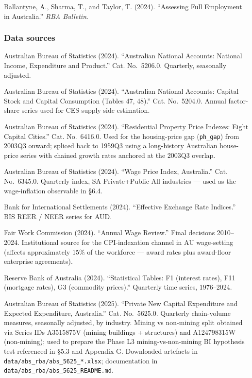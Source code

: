 \documentclass[
]{article}
\begin{document}
Ballantyne, A., Sharma, T., and Taylor, T. (2024). ``Assessing Full
Employment in Australia.'' \emph{RBA Bulletin}.

\subsubsection{Data sources}\label{data-sources}

Australian Bureau of Statistics (2024). ``Australian National Accounts:
National Income, Expenditure and Product.'' Cat. No.~5206.0. Quarterly,
seasonally adjusted.

Australian Bureau of Statistics (2024). ``Australian National Accounts:
Capital Stock and Capital Consumption (Tables 47, 48).'' Cat.
No.~5204.0. Annual factor-share series used for CES supply-side
estimation.

Australian Bureau of Statistics (2024). ``Residential Property Price
Indexes: Eight Capital Cities.'' Cat. No.~6416.0. Used for the
housing-price gap (\texttt{ph\_gap}) from 2003Q3 onward; spliced back to
1959Q3 using a long-history Australian house-price series with chained
growth rates anchored at the 2003Q3 overlap.

Australian Bureau of Statistics (2024). ``Wage Price Index, Australia.''
Cat. No.~6345.0. Quarterly index, SA Private+Public All industries ---
used as the wage-inflation observable in §6.4.

Bank for International Settlements (2024). ``Effective Exchange Rate
Indices.'' BIS REER / NEER series for AUD.

Fair Work Commission (2024). ``Annual Wage Review.'' Final decisions
2010--2024. Institutional source for the CPI-indexation channel in AU
wage-setting (affects approximately 15\% of the workforce --- award
rates plus award-floor enterprise agreements).

Reserve Bank of Australia (2024). ``Statistical Tables: F1 (interest
rates), F11 (mortgage rates), G3 (commodity prices).'' Quarterly time
series, 1976--2024.

Australian Bureau of Statistics (2025). ``Private New Capital
Expenditure and Expected Expenditure, Australia.'' Cat. No.~5625.0.
Quarterly chain-volume measures, seasonally adjusted, by industry.
Mining vs non-mining split obtained via Series IDs A3515875V (mining
buildings + structures) and A124798315W (non-mining); used to prepare
the Phase L3 mining-vs-non-mining BI hypothesis test referenced in §5.3
and Appendix G. Downloaded artefacts in
\texttt{data/abs\_rba/abs\_5625\_*.xlsx}; documentation in
\texttt{data/abs\_rba/abs\_5625\_README.md}.
\end{document}
